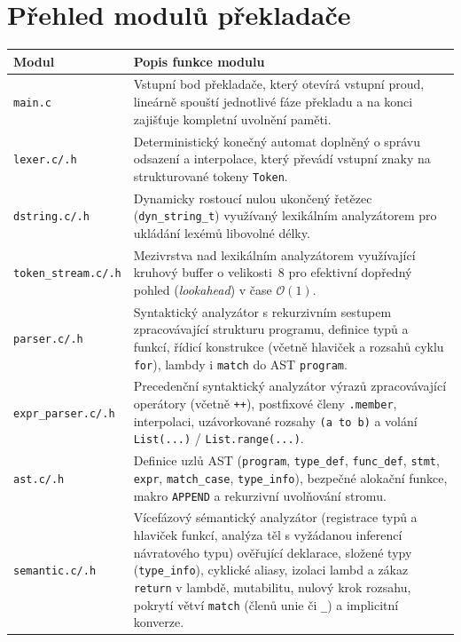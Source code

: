 \documentclass[11pt, a4paper]{article}
\renewcommand{\arraystretch}{1.15}%
\begin{document}
\vfill
\newpage
\section{Přehled modulů překladače}

\begin{table}[H]
  \centering
  \small
  \renewcommand{\arraystretch}{1.2}
  \begin{tabularx}{\textwidth}{l X}
    \toprule
    \textbf{Modul} & \textbf{Popis funkce modulu} \\
    \midrule
    \texttt{main.c} & Vstupní bod překladače, který otevírá vstupní proud, lineárně spouští jednotlivé fáze překladu a na konci zajišťuje kompletní uvolnění paměti. \\
    \texttt{lexer.c/.h} & Deterministický konečný automat doplněný o správu odsazení a interpolace, který převádí vstupní znaky na strukturované tokeny \texttt{Token}. \\
    \texttt{dstring.c/.h} & Dynamicky rostoucí nulou ukončený řetězec (\texttt{dyn\_string\_t}) využívaný lexikálním analyzátorem pro ukládání lexémů libovolné délky. \\
    \texttt{token\_stream.c/.h} & Mezivrstva nad lexikálním analyzátorem využívající kruhový buffer o velikosti~8 pro efektivní dopředný pohled (\textit{lookahead}) v čase $\mathcal{O}(1)$. \\
  \texttt{parser.c/.h} & Syntaktický analyzátor s rekurzivním sestupem zpracovávající strukturu programu, definice typů a funkcí, řídicí konstrukce (včetně hlaviček a rozsahů cyklu \texttt{for}), lambdy i \texttt{match} do AST \texttt{program}. \\
    \texttt{expr\_parser.c/.h} & Precedenční syntaktický analyzátor výrazů zpracovávající operátory (včetně \texttt{++}), postfixové členy \texttt{.member}, interpolaci, uzávorkované rozsahy \texttt{(a to b)} a volání \texttt{List(...)} / \texttt{List.range(...)}. \\
    \texttt{ast.c/.h} & Definice uzlů AST (\texttt{program}, \texttt{type\_def}, \texttt{func\_def}, \texttt{stmt}, \texttt{expr}, \texttt{match\_case}, \texttt{type\_info}), bezpečné alokační funkce, makro \texttt{APPEND} a rekurzivní uvolňování stromu. \\
\texttt{semantic.c/.h} & Vícefázový sémantický analyzátor (registrace typů a hlaviček funkcí, analýza těl s vyžádanou inferencí návratového typu) ověřující deklarace, složené typy (\texttt{type\_info}), cyklické aliasy, izolaci lambd a zákaz \texttt{return} v lambdě, mutabilitu, nulový krok rozsahu, pokrytí větví \texttt{match} (členů unie či \texttt{\_}) a implicitní konverze. \\

\end{tabularx}
\end{table}
\end{document}
